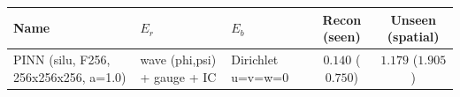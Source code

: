 \begin{center}
\begin{tabular}{lll cc}
\toprule
Name & $E_r$ & $E_b$ & Recon (seen) & Unseen (spatial) \\
\midrule
PINN (silu, F256, 256x256x256, a=1.0) & wave (phi,psi) + gauge + IC & Dirichlet u=v=w=0 & $0.140$ ($0.750$) & $1.179$ ($1.905$) \\
\bottomrule
\end{tabular}
\end{center}
